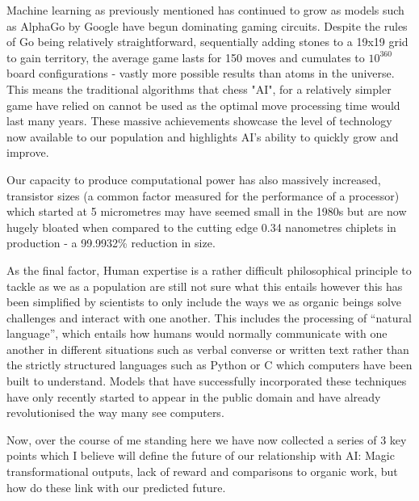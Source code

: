 Machine learning as previously mentioned has continued to grow as models such as AlphaGo by Google have begun dominating gaming circuits. Despite the rules of Go being relatively straightforward, sequentially adding stones to a 19x19 grid to gain territory, the average game lasts for 150 moves and cumulates to $10^360$ board configurations - vastly more possible results than atoms in the universe. This means the traditional algorithms that chess "AI", for a relatively simpler game have relied on cannot be used as the optimal move processing time would last many years. These massive achievements showcase the level of technology now available to our population and highlights AI's ability to quickly grow and improve.

Our capacity to produce computational power has also massively increased, transistor sizes (a common factor measured for the performance of a processor) which started at 5 micrometres may have seemed small in the 1980s but are now hugely bloated when compared to the cutting edge 0.34 nanometres chiplets in production - a 99.9932\% reduction in size.

As the final factor, Human expertise is a rather difficult philosophical principle to tackle as we as a population are still not sure what this entails however this has been simplified by scientists to only include the ways we as organic beings solve challenges and interact with one another. This includes the processing of “natural language”, which entails how humans would normally communicate with one another in different situations such as verbal converse or written text rather than the strictly structured languages such as Python or C which computers have been built to understand. Models that have successfully incorporated these techniques have only recently started to appear in the public domain and have already revolutionised the way many see computers.

Now, over the course of me standing here we have now collected a series of 3 key points which I believe will define the future of our relationship with AI: Magic transformational outputs, lack of reward and comparisons to organic work, but how do these link with our predicted future.

